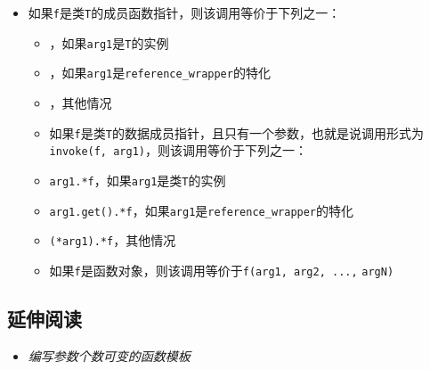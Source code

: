 \begin{itemize}
\item 如果\texttt{f}是类\texttt{T}的成员函数指针，则该调用等价于下列之一：



\begin{itemize}
\item {}，如果\texttt{arg1}是\texttt{T}的实例



\item {}，如果\texttt{arg1}是\texttt{reference\_\allowbreak{}wrapper}的特化



\item {}，其他情况



\item 如果\texttt{f}是类\texttt{T}的数据成员指针，且只有一个参数，也就是说调用形式为\texttt{invoke(\allowbreak{}f, arg1)}，则该调用等价于下列之一：



\item \texttt{arg1.\allowbreak{}*f}，如果\texttt{arg1}是类\texttt{T}的实例



\item \texttt{arg1.\allowbreak{}get().\allowbreak{}*f}，如果\texttt{arg1}是\texttt{reference\_\allowbreak{}wrapper}的特化



\item \texttt{(\allowbreak{}*arg1).\allowbreak{}*f}，其他情况



\item 如果\texttt{f}是函数对象，则该调用等价于\texttt{f(\allowbreak{}arg1, arg2, ...\allowbreak{},} \texttt{argN)}

\end{itemize}

\end{itemize}



\subsection{延伸阅读}



\begin{itemize}
\item \textit{编写参数个数可变的函数模板}

\end{itemize}

